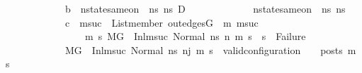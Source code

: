 \begin{isabellebody}
\ \ \ \ \ \ \ \ \ \ \ \ {\isacharparenleft}{\kern0pt}b\ {\isasymLongrightarrow}\ nstate{\isacharunderscore}{\kern0pt}same{\isacharunderscore}{\kern0pt}on\ {\isasymLambda}\ ns{}\ ns{}{\isacharprime}{\kern0pt}{\isacharprime}{\kern0pt}\ D{\isacharparenright}{\kern0pt}\ {\isasymLongrightarrow}\isanewline
\ \ \ \ \ \ \ \ \ \ \ \ nstate{\isacharunderscore}{\kern0pt}same{\isacharunderscore}{\kern0pt}on\ {\isasymLambda}\ ns{}{\isacharprime}{\kern0pt}{\isacharprime}{\kern0pt}\ ns{}{\isacharprime}{\kern0pt}{\isacharprime}{\kern0pt}\ {\isacharbraceleft}{\kern0pt}{\isacharbraceright}{\kern0pt}\ {\isasymLongrightarrow}\isanewline
\ \ \ \ \ \ \ \ \ \ \ \ {\isacharparenleft}{\kern0pt}{\isasymnot}c\ {\isasymlongrightarrow}\ {\isacharparenleft}{\kern0pt}{\isasymforall}msuc{}{\isachardot}{\kern0pt}\ \ List{\isachardot}{\kern0pt}member\ {\isacharparenleft}{\kern0pt}out{\isacharunderscore}{\kern0pt}edges{\isacharparenleft}{\kern0pt}G{}{\isacharparenright}{\kern0pt}\ {\isacharbang}{\kern0pt}\ m{}{\isacharparenright}{\kern0pt}\ msuc{}\ {\isasymlongrightarrow}\isanewline
\ \ \ \ \ \ \ \ \ \ \ \ \ \ \ \ {\isacharparenleft}{\kern0pt}{\isasymforall}m{}\ s{}{\isachardot}{\kern0pt}\ {\isacharparenleft}{\kern0pt}{\isacharparenleft}{\kern0pt}M{\isacharcomma}{\kern0pt}{\isasymLambda}{\isacharcomma}{\kern0pt}{\isasymGamma}{\isacharcomma}{\kern0pt}{\isasymOmega}{\isacharcomma}{\kern0pt}G{}\ {\isasymturnstile}\ {\isacharparenleft}{\kern0pt}Inl{\isacharparenleft}{\kern0pt}msuc{}{\isacharparenright}{\kern0pt}{\isacharcomma}{\kern0pt}\ Normal\ ns{}{\isacharprime}{\kern0pt}{\isacharprime}{\kern0pt}{\isacharparenright}{\kern0pt}\ {\isacharminus}{\kern0pt}n{\isasymrightarrow}{\isacharasterisk}{\kern0pt}\ {\isacharparenleft}{\kern0pt}m{}{\isacharcomma}{\kern0pt}\ s{}{\isacharparenright}{\kern0pt}{\isacharparenright}{\kern0pt}\ {\isasymlongrightarrow}\ s{}\ {\isasymnoteq}\ Failure{\isacharparenright}{\kern0pt}{\isacharparenright}{\kern0pt}{\isacharparenright}{\kern0pt}{\isacharparenright}{\kern0pt}\ {\isasymLongrightarrow}\isanewline
\ \ \ \ \ \ \ \ \ \ \ \ M{\isacharcomma}{\kern0pt}{\isasymLambda}{\isacharcomma}{\kern0pt}{\isasymGamma}{\isacharcomma}{\kern0pt}{\isasymOmega}{\isacharcomma}{\kern0pt}G{}\ {\isasymturnstile}\ {\isacharparenleft}{\kern0pt}Inl{\isacharparenleft}{\kern0pt}msuc{\isacharparenright}{\kern0pt}{\isacharcomma}{\kern0pt}\ Normal\ ns{}{\isacharprime}{\kern0pt}{\isacharprime}{\kern0pt}{\isacharparenright}{\kern0pt}\ {\isacharminus}{\kern0pt}n{\isasymrightarrow}{\isacharcircum}{\kern0pt}j{\isacharprime}{\kern0pt}\ {\isacharparenleft}{\kern0pt}m{\isacharprime}{\kern0pt}{\isacharcomma}{\kern0pt}\ s{\isacharprime}{\kern0pt}{\isacharparenright}{\kern0pt}\ {\isasymLongrightarrow}\ valid{\isacharunderscore}{\kern0pt}configuration\ {\isasymLambda}\ {\isasymGamma}\ {\isasymOmega}\ posts\ m{\isacharprime}{\kern0pt}\ s{\isacharprime}{\kern0pt}{\isachardoublequoteclose}\isanewline

\end{isabellebody}
